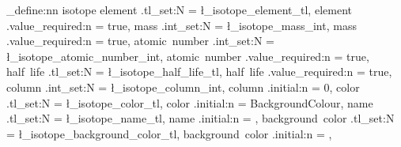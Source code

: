 \documentclass{article}
\begin{document}
\keys_define:nn {isotope} {
    element .tl_set:N = \l_isotope_element_tl,
    element .value_required:n = true,
    mass .int_set:N = \l_isotope_mass_int,
    mass .value_required:n = true,
    atomic~number .int_set:N = \l_isotope_atomic_number_int,
    atomic~number .value_required:n = true,
    half~life .tl_set:N = \l_isotope_half_life_tl,
    half~life .value_required:n = true,
    column .int_set:N = \l_isotope_column_int,
    column .initial:n = 0,
    color .tl_set:N = \l_isotope_color_tl,
    color .initial:n = BackgroundColour,
    name .tl_set:N = \l_isotope_name_tl,
    name .initial:n = {},
    background~color .tl_set:N = \l_isotope_background_color_tl,
    background~color .initial:n = {},
}
\newcommand{\isotopenode}[1]{
    \group_begin:

    \keys_set:nn {isotope} {#1}
    \tl_if_empty:NTF \l_isotope_name_tl {
        \tl_set:Nx \l_isotope_name_tl {\l_isotope_element_tl _\fp_to_decimal:n{\l_isotope_mass_int}}
    }{}
    \tl_if_empty:NTF \l_isotope_background_color_tl {
        \tl_set:Nx \l_isotope_background_color_tl {\l_isotope_color_tl _5}
    }{}
    \node[isotope, fill = \l_isotope_background_color_tl, below~right] (\l_isotope_name_tl) at ({\fp_to_decimal:n{\l_isotope_column_int} * \nodewidth * 1.25cm}, {\fp_to_decimal:n{\l_isotope_atomic_number_int - 81} * \nodeheight * 1em}) {};
    \node[\l_isotope_color_tl, inner~sep = 0pt, below = 0.5em] (symbol) at (\l_isotope_name_tl.north) {\bfseries\l_isotope_element_tl};
    \node[left = 0pt, inner~sep = 0pt, \l_isotope_color_tl] at (symbol.north~west) {\tiny\bfseries\fp_to_decimal:n{\l_isotope_mass_int}};
    \node[left = 0pt, inner~sep = 0pt, \l_isotope_color_tl] at (symbol.south~west) {\tiny\bfseries\fp_to_decimal:n{\l_isotope_atomic_number_int}};
    \node[above = 0.5em, inner~sep = 0pt, ForegroundColour, align = center, scale = 0.9] at (\l_isotope_name_tl.south) {\scriptsize\bfseries\l_isotope_half_life_tl};
    \group_end:
}

\ExplSyntaxOff
\end{document}

